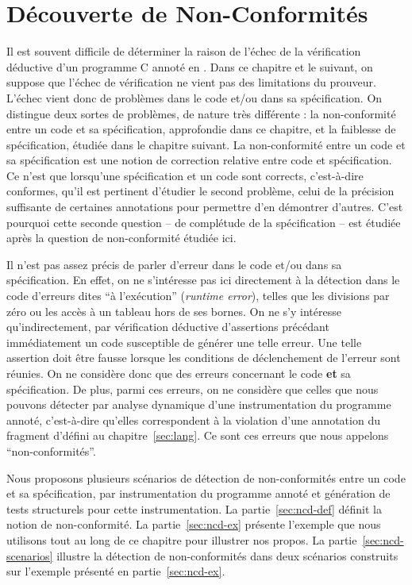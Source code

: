
\chapter{Découverte de Non-Conformités}
\label{sec:ncd}

\chapterintro


Il est souvent difficile de déterminer la raison de l'échec de la vérification
déductive d'un programme C annoté en \eacsl.
Dans ce chapitre et le suivant, on suppose que l'échec de vérification ne vient
pas des limitations du prouveur.
L'échec vient donc de problèmes dans le code et/ou dans sa spécification.
On distingue deux sortes de problèmes, de nature très différente : la
non-conformité entre un code et sa spécification, approfondie dans ce chapitre,
et la faiblesse de spécification, étudiée dans le chapitre suivant.
La non-conformité entre un code et sa spécification est une notion de correction
relative entre code et spécification.
Ce n'est que lorsqu'une spécification et un code sont corrects, c'est-à-dire
conformes, qu'il est pertinent d'étudier le second problème, celui de la
précision suffisante de certaines annotations pour permettre d'en démontrer
d'autres.
C'est pourquoi cette seconde question -- de complétude de la spécification --
est étudiée après la question de non-conformité étudiée ici.

Il n'est pas assez précis de parler d'erreur dans le code et/ou dans sa
spécification.
En effet, on ne s'intéresse pas ici directement à la détection dans le code
d'erreurs dites ``à l'exécution'' (\textit{runtime error}), telles que les
divisions par zéro ou les accès à un tableau hors de ses bornes.
On ne s'y intéresse qu'indirectement, par vérification déductive d'assertions
précédant immédiatement un code susceptible de générer une telle erreur.
Une telle assertion doit être fausse lorsque les conditions de déclenchement de
l'erreur sont réunies.
On ne considère donc que des erreurs concernant le code \textbf{et} sa
spécification.
De plus, parmi ces erreurs, on ne considère que celles que nous pouvons
détecter par analyse dynamique d'une instrumentation du programme annoté,
c'est-à-dire qu'elles correspondent à la violation d'une annotation du fragment
d'\eacsl défini au chapitre~\ref{sec:lang}.
Ce sont ces erreurs que nous appelons ``non-conformités''.

Nous proposons plusieurs scénarios de détection de non-conformités entre un code
et sa spécification, par instrumentation du programme annoté et génération de
tests structurels pour cette instrumentation.
La partie~\ref{sec:ncd-def} définit la notion de non-conformité.
La partie~\ref{sec:ncd-ex} présente l'exemple que nous utilisons tout au long
de ce chapitre pour illustrer nos propos.
La partie~\ref{sec:ncd-scenarios} illustre la détection de non-conformités dans
deux scénarios construits sur l'exemple présenté en partie~\ref{sec:ncd-ex}.


